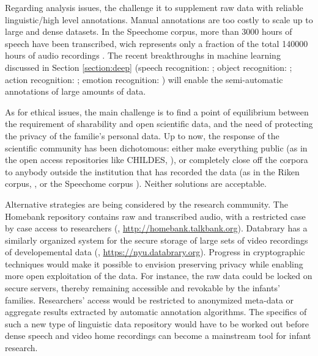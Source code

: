 \documentclass[jou,apacite]{apa6}
\begin{document}
Regarding analysis issues, the challenge it to supplement raw data with reliable linguistic/high level annotations. Manual annotations are too costly to scale up to  large and dense datasets. In the Speechome corpus, more than 3000 hours of speech have been transcribed, wich represents only a fraction of the total 140000 hours of audio recordings \cite{roy_2015}. The recent breakthroughs in machine learning discussed in Section \ref{section:deep} (speech recognition: ; object recognition: ; action recognition: ; emotion recognition: ) will enable the semi-automatic annotations of large amounts of data. 



As for ethical issues, %
the main challenge is to find a point of equilibrium between the requirement of sharability and open scientific data, and the need of protecting the privacy of the familie's personal  data. Up to now, the response of the scientific community has been dichotomous: either make everything public (as in the open access repositories like CHILDES, ), or completely close off the corpora to anybody outside the institution that has recorded the data (as in the Riken corpus, , or the Speechome corpus ). Neither solutions are acceptable. 

Alternative strategies are being considered by the research community. The Homebank repository contains raw and transcribed audio, with a restricted case by case access to researchers (, \url{http://homebank.talkbank.org}). Databrary has a similarly organized system for the secure storage of large sets of video recordings of developemental data (, \url{https://nyu.databrary.org}). Progress in cryptographic techniques would make it possible to envision preserving privacy while enabling more open exploitation of the data. For instance, the raw data could be locked on secure servers, thereby remaining accessible and revokable by the infants' families. Researchers' access would be restricted to anonymized meta-data or aggregate results extracted by automatic annotation algorithms. %
The specifics of such a new type of linguistic data repository would have to be worked out before dense speech and video home recordings can become a mainstream tool for infant research. 
\end{document}
